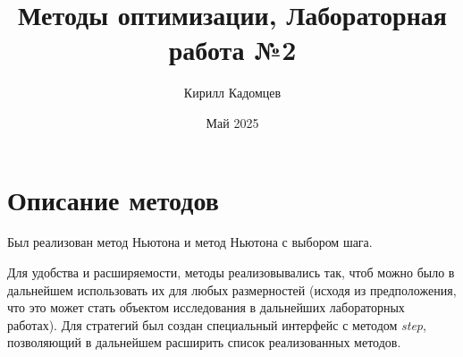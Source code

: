 \documentclass{article}
\title{Методы оптимизации, Лабораторная работа №2}
\author{Кирилл Кадомцев}
\date{Май 2025}
\begin{document}
\maketitle
\tableofcontents

\section{Описание методов}
Был реализован метод Ньютона и метод Ньютона с выбором шага.

Для удобства и расширяемости, методы реализовывались так, чтоб можно было в дальнейшем использовать их для любых размерностей (исходя из предположения, что это может стать объектом исследования в дальнейших лабораторных работах). Для стратегий был создан специальный интерфейс с методом \textit{step}, позволяющий в дальнейшем расширить список реализованных методов.
\end{document}
